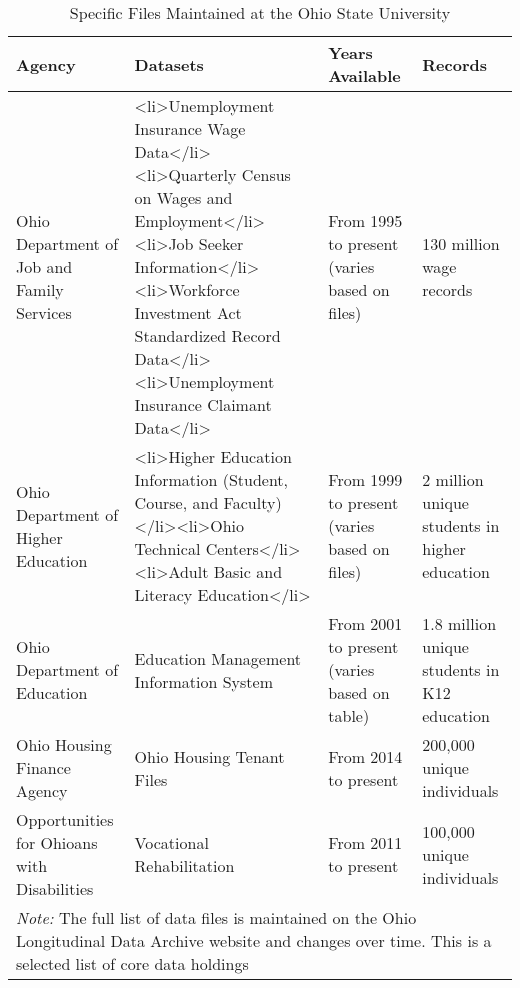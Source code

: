 \begin{table}

\caption{\label{tab:}Specific Files Maintained at the Ohio State University}
\centering
\begin{tabular}[t]{llll}
\toprule
Agency & Datasets & Years Available & Records\\
\midrule
Ohio Department of Job and Family Services & <li>Unemployment Insurance Wage Data</li><li>Quarterly Census on Wages and Employment</li><li>Job Seeker Information</li><li>Workforce Investment Act Standardized Record Data</li><li>Unemployment Insurance Claimant Data</li> & From 1995 to present (varies based on files) & 130 million wage records\\
Ohio Department of Higher Education & <li>Higher Education Information (Student, Course, and Faculty)</li><li>Ohio Technical Centers</li><li>Adult Basic and Literacy Education</li> & From 1999 to present (varies based on files) & 2 million unique students in higher education\\
Ohio Department of Education & Education Management Information System & From 2001 to present (varies based on table) & 1.8 million unique students in K12 education\\
Ohio Housing Finance Agency & Ohio Housing Tenant Files & From 2014 to present & 200,000 unique individuals\\
Opportunities for Ohioans with Disabilities & Vocational Rehabilitation & From 2011 to present & 100,000 unique individuals\\
\bottomrule
\multicolumn{4}{l}{\rule{0pt}{1em}\textit{Note: } The full list of data files is maintained on the Ohio Longitudinal Data Archive website and changes over time. This is a selected list of core data holdings}\\
\end{tabular}
\end{table}

